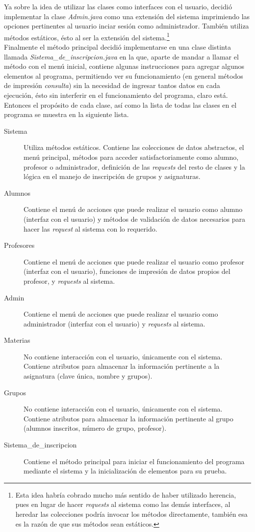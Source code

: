 \documentclass[a4paper,12pt]{article}
\begin{document}
Ya sobre la idea de utilizar las clases como interfaces con el usuario, decidió implementar la clase \textit{Admin.java} como una extensión del sistema imprimiendo las opciones pertinentes al usuario inciar sesión como administrador. También utiliza métodos estáticos, ésto al ser la extensión del sistema.\footnote{Esta idea habría cobrado mucho más sentido de haber utilizado herencia, pues en lugar de hacer \textit{requests} al sistema como las demás interfaces, al heredar las colecciones podría invocar los métodos directamente, también esa es la razón de que sus métodos sean estáticos.}\\

Finalmente el método principal decidió implementarse en una clase distinta llamada \textit{Sistema\_de\_inscripcion.java} en la que, aparte de mandar a llamar el método con el menú inicial, contiene algunas instrucciones para agregar algunos elementos al programa, permitiendo ver su funcionamiento (en general métodos de impresión \textit{consulta}) sin la necesidad de ingresar tantos datos en cada ejecución, ésto sin interferir en el funcionamiento del programa, claro está.\\

Entonces el propósito de cada clase, así como la lista de todas las clases en el programa se muestra en la siguiente lista.

\begin{description}
    \item [Sistema] Utiliza métodos estáticos. Contiene las colecciones de datos abstractos, el menú principal, métodos para acceder satisfactoriamente como alumno, profesor o administrador, definición de las \textit{requests} del resto de clases y la lógica en el manejo de inscripción de grupos y asignaturas.
    \item [Alumnos] Contiene el menú de acciones que puede realizar el usuario como alumno (interfaz con el usuario) y métodos de validación de datos necesarios para hacer las \textit{request} al sistema con lo requerido.
    \item [Profesores] Contiene el menú de acciones que puede realizar el usuario como profesor (interfaz con el usuario), funciones de impresión de datos propios del profesor, y \textit{requests} al sistema.
    \item [Admin] Contiene el menú de acciones que puede realizar el usuario como administrador (interfaz con el usuario) y \textit{requests} al sistema.
    \item [Materias] No contiene interacción con el usuario, únicamente con el sistema. Contiene atributos para almacenar la información pertinente a la asignatura (clave única, nombre y grupos).
    \item [Grupos] No contiene interacción con el usuario, únicamente con el sistema. Contiene atributos para almacenar la información pertinente al grupo (alumnos inscritos, número de grupo, profesor).
    \item [Sistema\_de\_inscripcion] Contiene el método principal para iniciar el funcionamiento del programa mediante el sistema y la inicialización de elementos para su prueba.
\end{description}
\end{document}
